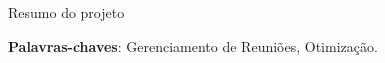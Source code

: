 \begin{resumo}

 Resumo do projeto

 \vspace{\onelineskip}

 \noindent
 \textbf{Palavras-chaves}: Gerenciamento de Reuniões, Otimização.
\end{resumo}
